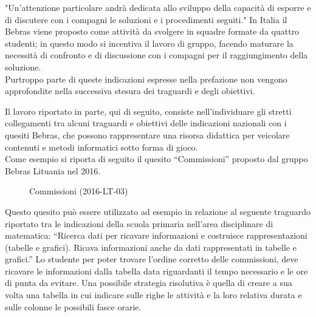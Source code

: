 \documentclass[12pt]{report}
\begin{document}
"Un’attenzione particolare andrà dedicata allo sviluppo della capacità di esporre e di discutere con i compagni le soluzioni e i procedimenti seguiti."
In Italia il Bebras viene proposto come attività da svolgere in squadre formate da quattro studenti; in questo modo si incentiva il lavoro di gruppo, facendo maturare la necessità di confronto e di discussione con i compagni per il raggiungimento della soluzione.
\\

Purtroppo parte di queste indicazioni espresse nella prefazione non vengono approfondite nella successiva stesura dei traguardi e degli obiettivi.

Il lavoro riportato in parte, qui di seguito, consiste nell'individuare gli stretti collegamenti tra alcuni traguardi e obiettivi delle indicazioni nazionali con i quesiti Bebras, che possono rappresentare una risorsa didattica per veicolare contenuti e metodi informatici sotto forma di gioco.
\\

Come esempio si riporta di seguito il quesito “Commissioni” proposto dal gruppo Bebras Lituania nel 2016.

\begin{figure}[H]
	\centering
	\caption{Commissioni (2016-LT-03)}\label{fig:4}
\end{figure}

Questo quesito può essere utilizzato ad esempio in relazione al seguente traguardo riportato tra le indicazioni della scuola primaria nell'area disciplinare di matematica:
“Ricerca dati per ricavare informazioni e costruisce rappresentazioni (tabelle e grafici). Ricava informazioni anche da dati rappresentati in tabelle e grafici.”
Lo studente per poter trovare l'ordine corretto delle commissioni, deve ricavare le informazioni dalla tabella data riguardanti il tempo necessario e le ore di punta da evitare. Una possibile strategia risolutiva è quella di creare a sua volta una tabella in cui indicare sulle righe le attività e la loro relativa durata e sulle colonne le possibili fasce orarie.
\end{document}
